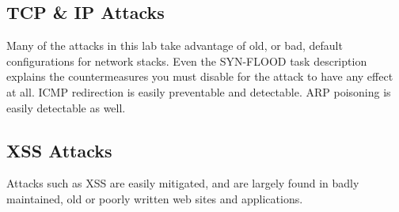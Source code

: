 \subsection{TCP \& IP Attacks}
Many of the attacks in this lab take advantage of old, or bad, default configurations for network stacks.
Even the SYN-FLOOD task description explains the countermeasures you must disable for the attack to have any effect at
all. ICMP redirection is easily preventable and detectable. ARP poisoning is easily detectable as well.

\subsection{XSS Attacks}
Attacks such as XSS are easily mitigated,\cite{cheatsheet} and are largely found in badly maintained, old or poorly written web sites
and applications.
